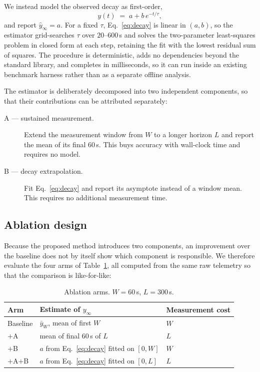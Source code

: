 \documentclass[11pt,a4paper]{article}
\begin{document}
We instead model the observed decay as first-order,
\begin{equation}
y(t) \;=\; a + b\,e^{-t/\tau},
\label{eq:decay}
\end{equation}
and report $\hat{y}_\infty = a$. For a fixed $\tau$, Eq.~\eqref{eq:decay} is
linear in $(a,b)$, so the estimator grid-searches $\tau$ over $20$--$600$\,s and
solves the two-parameter least-squares problem in closed form at each step,
retaining the fit with the lowest residual sum of squares. The procedure is
deterministic, adds no dependencies beyond the standard library, and completes
in milliseconds, so it can run inside an existing benchmark harness rather than
as a separate offline analysis.

The estimator is deliberately decomposed into two independent components, so
that their contributions can be attributed separately:
\begin{description}
  \item[A --- sustained measurement.] Extend the measurement window from $W$ to
    a longer horizon $L$ and report the mean of its final 60\,s. This buys
    accuracy with wall-clock time and requires no model.
  \item[B --- decay extrapolation.] Fit Eq.~\eqref{eq:decay} and report its
    asymptote instead of a window mean. This requires no additional measurement
    time.
\end{description}

\subsection{Ablation design}
Because the proposed method introduces two components, an improvement over the
baseline does not by itself show which component is responsible. We therefore
evaluate the four arms of Table~\ref{tab:arms}, all computed from the same raw
telemetry so that the comparison is like-for-like:

\begin{table}[h]
\centering
\caption{Ablation arms. $W=60$\,s, $L=300$\,s.}
\label{tab:arms}
\begin{tabular}{lll}
\toprule
Arm & Estimate of $y_\infty$ & Measurement cost \\
\midrule
Baseline & $\bar{y}_W$, mean of first $W$ & $W$ \\
$+$A     & mean of final 60\,s of $L$ & $L$ \\
$+$B     & $a$ from Eq.~\eqref{eq:decay} fitted on $[0,W]$ & $W$ \\
$+$A$+$B & $a$ from Eq.~\eqref{eq:decay} fitted on $[0,L]$ & $L$ \\
\bottomrule
\end{tabular}
\end{table}
\end{document}
